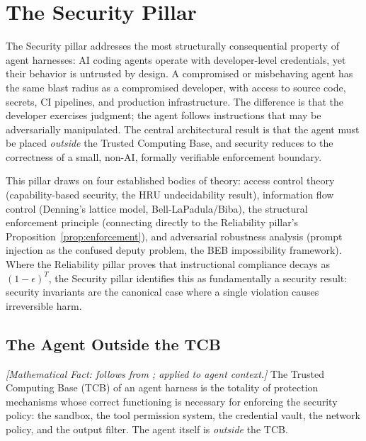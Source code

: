 \section{The Security Pillar}
\label{sec:security}

The Security pillar addresses the most structurally consequential property of agent harnesses: AI coding agents operate with developer-level credentials, yet their behavior is untrusted by design. A compromised or misbehaving agent has the same blast radius as a compromised developer, with access to source code, secrets, CI pipelines, and production infrastructure. The difference is that the developer exercises judgment; the agent follows instructions that may be adversarially manipulated. The central architectural result is that the agent must be placed \emph{outside} the Trusted Computing Base, and security reduces to the correctness of a small, non-AI, formally verifiable enforcement boundary.

This pillar draws on four established bodies of theory: access control theory (capability-based security, the HRU undecidability result), information flow control (Denning's lattice model, Bell-LaPadula/Biba), the structural enforcement principle (connecting directly to the Reliability pillar's Proposition~\ref{prop:enforcement}), and adversarial robustness analysis (prompt injection as the confused deputy problem, the BEB impossibility framework). Where the Reliability pillar proves that instructional compliance decays as $(1-\epsilon)^T$, the Security pillar identifies this as fundamentally a security result: security invariants are the canonical case where a single violation causes irreversible harm.

\subsection{The Agent Outside the TCB}

\begin{definition}
\emph{[Mathematical Fact: follows from \citet{dod1985orange}; applied to agent context.]}
\label{def:tcb-security}
The Trusted Computing Base (TCB) of an agent harness is the totality of protection mechanisms whose correct functioning is necessary for enforcing the security policy: the sandbox, the tool permission system, the credential vault, the network policy, and the output filter. The agent itself is \emph{outside} the TCB.
\end{definition}

